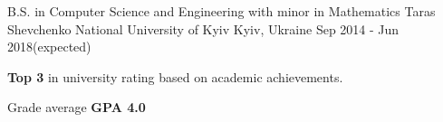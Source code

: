 

\begin{cventries}

  \cventry
    {B.S. in Computer Science and Engineering with minor in Mathematics} %
    {Taras Shevchenko National University of Kyiv} %
    {Kyiv, Ukraine} %
    {Sep 2014 - Jun 2018(expected)} %
    {
      \begin{cvitems} %
        \item {\textbf{Top 3} in university rating based on academic achievements.}
        \item {Grade average \textbf{GPA 4.0}}
      \end{cvitems}
    }
\end{cventries}
